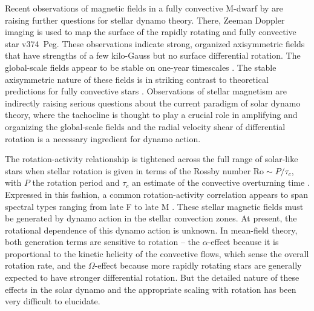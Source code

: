 Recent observations of magnetic fields in a fully convective M-dwarf by
\cite{Donati_et_al_2006} are raising further questions for stellar dynamo
theory.  There, Zeeman Doppler imaging is used to map the surface of the rapidly rotating
and fully convective star v374~Peg.  These observations indicate
strong, organized axisymmetric fields that have strengths of a few
kilo-Gauss but no surface differential rotation.  The global-scale fields appear to be stable
on one-year timescales \citep{Morin_et_al_2008}.  The stable axisymmetric
nature of these fields is in striking contrast to theoretical
predictions for fully convective stars 
\citep[e.g.,][]{Kuker&Rudiger_1999,Kuker&Rudiger_2005_AN, Chabrier&Kuker_2006}. 
Observations of stellar magnetism are indirectly raising 
serious questions about the current paradigm of solar dynamo theory,
where the tachocline is thought to play a crucial role in amplifying and
organizing the global-scale fields and the radial velocity shear of
differential rotation %
is a necessary ingredient for dynamo action.   

The rotation-activity relationship is tightened across the full range
of solar-like stars when stellar rotation is
given in terms of the Rossby number $\mathrm{Ro} \sim P/\tau_c$, with $P$ the
rotation period and $\tau_c$ an estimate of the convective overturning time
\citep[e.g.,][]{Noyes_et_al_1984a}.  Expressed in this fashion, a common
rotation-activity correlation appears to span spectral types ranging from
late F to late M \citep[e.g.,][]{Patten&Simon_1996, Mohanty&Basri_2003,
  Pizzolato_et_al_2003, Reiners&Basri_2007}. 
These stellar magnetic fields must be generated by dynamo action in
the stellar convection zones.  At present, the rotational dependence
of this dynamo action is unknown.
In mean-field theory, both generation terms are sensitive to rotation
-- the $\alpha$-effect because 
it is proportional to the kinetic helicity of the convective flows, which
sense the overall rotation rate, and the $\Omega$-effect because
more rapidly rotating stars are generally expected to have stronger
differential rotation.  But the detailed nature of these effects in
the solar dynamo and the appropriate scaling with rotation has been
very difficult to elucidate. 



